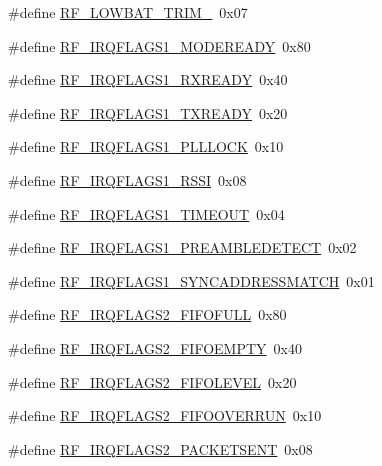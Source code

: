 \begin{DoxyCompactItemize}
\#define \hyperlink{sx1276Regs-Fsk_8h_aabf95f34e7473a492e723c6adfffd368}{R\+F\+\_\+\+L\+O\+W\+B\+A\+T\+\_\+\+T\+R\+I\+M\+\_}~0x07
\item 
\#define \hyperlink{sx1276Regs-Fsk_8h_a9af03b2b868666a55780e8337c6e7497}{R\+F\+\_\+\+I\+R\+Q\+F\+L\+A\+G\+S1\+\_\+\+M\+O\+D\+E\+R\+E\+A\+DY}~0x80
\item 
\#define \hyperlink{sx1276Regs-Fsk_8h_ad4616b07e6107a520a6736e7d3759d3c}{R\+F\+\_\+\+I\+R\+Q\+F\+L\+A\+G\+S1\+\_\+\+R\+X\+R\+E\+A\+DY}~0x40
\item 
\#define \hyperlink{sx1276Regs-Fsk_8h_a465d49e932f278f59902789e70a3c713}{R\+F\+\_\+\+I\+R\+Q\+F\+L\+A\+G\+S1\+\_\+\+T\+X\+R\+E\+A\+DY}~0x20
\item 
\#define \hyperlink{sx1276Regs-Fsk_8h_afea7644a493f829a930c6a4f9bc7acee}{R\+F\+\_\+\+I\+R\+Q\+F\+L\+A\+G\+S1\+\_\+\+P\+L\+L\+L\+O\+CK}~0x10
\item 
\#define \hyperlink{sx1276Regs-Fsk_8h_acddf4bcd9ff43eac1edf8aa1e4f6c7ad}{R\+F\+\_\+\+I\+R\+Q\+F\+L\+A\+G\+S1\+\_\+\+R\+S\+SI}~0x08
\item 
\#define \hyperlink{sx1276Regs-Fsk_8h_ac8d3e1c751fe2a0ba644dab36cf01d41}{R\+F\+\_\+\+I\+R\+Q\+F\+L\+A\+G\+S1\+\_\+\+T\+I\+M\+E\+O\+UT}~0x04
\item 
\#define \hyperlink{sx1276Regs-Fsk_8h_af93b6a2656990eaaac6467e5b7bb900e}{R\+F\+\_\+\+I\+R\+Q\+F\+L\+A\+G\+S1\+\_\+\+P\+R\+E\+A\+M\+B\+L\+E\+D\+E\+T\+E\+CT}~0x02
\item 
\#define \hyperlink{sx1276Regs-Fsk_8h_a9773a75aa15a6e081ee08400d0c99bdc}{R\+F\+\_\+\+I\+R\+Q\+F\+L\+A\+G\+S1\+\_\+\+S\+Y\+N\+C\+A\+D\+D\+R\+E\+S\+S\+M\+A\+T\+CH}~0x01
\item 
\#define \hyperlink{sx1276Regs-Fsk_8h_abd1e80863cab37648e006f1b10c8a099}{R\+F\+\_\+\+I\+R\+Q\+F\+L\+A\+G\+S2\+\_\+\+F\+I\+F\+O\+F\+U\+LL}~0x80
\item 
\#define \hyperlink{sx1276Regs-Fsk_8h_a3dab8f9ed1df7682ad585cb7d88fb9d6}{R\+F\+\_\+\+I\+R\+Q\+F\+L\+A\+G\+S2\+\_\+\+F\+I\+F\+O\+E\+M\+P\+TY}~0x40
\item 
\#define \hyperlink{sx1276Regs-Fsk_8h_a7740115745a3a932a9b7af0560632e42}{R\+F\+\_\+\+I\+R\+Q\+F\+L\+A\+G\+S2\+\_\+\+F\+I\+F\+O\+L\+E\+V\+EL}~0x20
\item 
\#define \hyperlink{sx1276Regs-Fsk_8h_ab8c3186a58e855c916590aafbef08cc6}{R\+F\+\_\+\+I\+R\+Q\+F\+L\+A\+G\+S2\+\_\+\+F\+I\+F\+O\+O\+V\+E\+R\+R\+UN}~0x10
\item 
\#define \hyperlink{sx1276Regs-Fsk_8h_ab17c87d7c87bb0cf9eae4db77b2902c9}{R\+F\+\_\+\+I\+R\+Q\+F\+L\+A\+G\+S2\+\_\+\+P\+A\+C\+K\+E\+T\+S\+E\+NT}~0x08

\end{DoxyCompactItemize}
